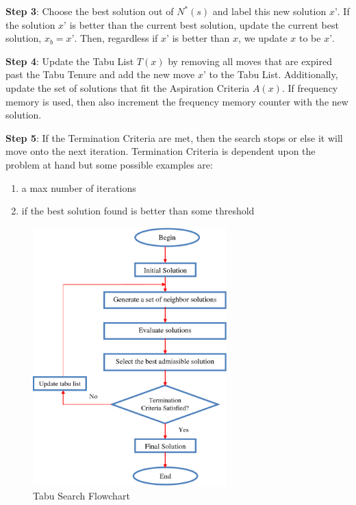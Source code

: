 \documentclass[conference]{IEEEtran}
\begin{document}
\textbf{Step 3}:
Choose the best solution out of $N^{*}(s)$ and label this new solution $x’$. If the solution $x’$ is better than the current best solution, update the current best solution, $x_{b} = x’$. Then, regardless if $x’$ is better than $x$, we update $x$ to be $x’$.

\textbf{Step 4}:
Update the Tabu List $T(x)$ by removing all moves that are expired past the Tabu Tenure and add the new move $x’$ to the Tabu List. Additionally, update the set of solutions that
fit the Aspiration Criteria $A(x)$. If frequency memory is used, then also increment the frequency memory counter with the new solution.

\textbf{Step 5}:
If the Termination Criteria are met, then the search stops or else it will move onto the next iteration. 
Termination Criteria is dependent upon the problem at hand but some possible examples are:

\begin{enumerate}
\item{a max number of iterations}
\item{if the best solution found is better than some threshold}
\end{enumerate}

\vspace{4mm}
\begin{figure}[htp]
\centering
    \includegraphics[height = 10cm]{Tabu_Search_Flowchart.png}
    \caption{Tabu Search Flowchart}
    \label{fig : General steps for a Simulated Annealing algorithm}
\end{figure}

\newpage
\end{document}
